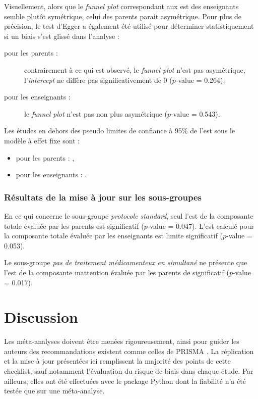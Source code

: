 Visuellement, alors que le \textit{funnel plot} correspondant aux \gls{est} des enseignants semble plutôt symétrique, celui des parents parait asymétrique. 
Pour plus de précision, le test d'Egger a également été utilisé pour déterminer statistiquement si un biais s'est glissé dans l'analyse \citep{Egger1997} :
\begin{description}
\item[pour les parents :] contrairement à ce qui est observé, le \textit{funnel plot} n'est pas asymétrique, l'\textit{intercept} ne diffère pas 
significativement de 0 ($p$-value = 0.264),
\item[pour les enseignants :]  le \textit{funnel plot} n'est pas non plus asymétrique ($p$-value = 0.543).
\end{description}

Les études en dehors des pseudo limites de confiance à 95\% de l'\gls{est} sous le modèle à effet fixe sont : 
\begin{itemize}
\item pour les parents : \citet{Christiansen2014}, 
\item pour les enseignants : \citet{Moreno2019, Shereena2019}. 
\end{itemize}
 
\subsubsection{Résultats de la mise à jour sur les sous-groupes}
 
En ce qui concerne le sous-groupe \emph{protocole standard}, seul l'\gls{est} de la composante totale évaluée par les parents est significatif ($p$-value = 0.047). 
L'\gls{est} calculé pour la composante totale évaluée par les enseignants est limite significatif ($p$-value = 0.053).

Le sous-groupe \emph{pas de traitement médicamenteux en simultané} ne présente que l'\gls{est} de la composante inattention évaluée par les parents de 
significatif ($p$-value = 0.017).

\section{Discussion} 

Les méta-analyses doivent être menées rigoureusement, ainsi pour guider les auteurs des recommandations existent comme celles de PRISMA \citep{Moher2009}.
La réplication et la mise à jour présentées ici remplissent la majorité des points de cette checklist, sauf notamment l'évaluation du risque de biais dans chaque étude.
Par ailleurs, elles ont été effectuées avec le package Python dont la fiabilité n'a été testée que sur une méta-analyse.
 
